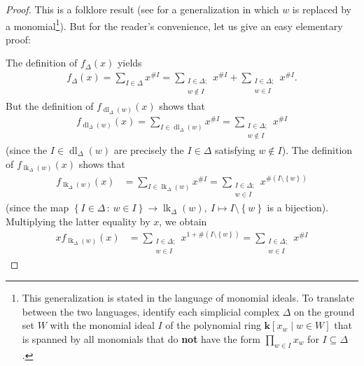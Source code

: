 \documentclass[12pt]{amsart}
\theoremstyle{definition}
\newcommand{\with}{\,\colon\,}
\DeclareMathOperator{\lk}{lk}
\DeclareMathOperator{\dl}{dl}
\newcommand{\set}[1]{\left\{ #1 \right\}}
\newcommand{\tup}[1]{\left( #1 \right)}
\begin{document}
\begin{proof}
This is a folklore result
(see \cite[the equality $\mathcal{F}_\Delta
= x \mathcal{F}_{\tup{\Delta:x}} + \mathcal{F}_{\tup{\Delta,x}}$
in the proof of
Lemma 2.4]{MariettiTesta08} for a generalization
in which $w$ is replaced by a monomial\footnote{This
generalization is stated in the language of monomial
ideals. To translate between the two languages,
identify each simplicial complex $\Delta$ on the ground
set $W$ with the monomial ideal $I$ of the polynomial ring
$\mathbf{k}\left[x_w \mid w \in W\right]$ that is
spanned by all monomials that do \textbf{not} have the
form $\prod_{w \in I} x_w$ for $I \subseteq \Delta$.}).
But for the reader's convenience,
let us give an easy elementary proof:

The definition of $f_{\Delta}\tup{x}$ yields
\begin{align}
f_{\Delta}\tup{x}
= \sum_{I \in \Delta} x^{\# I}
= \sum_{\substack{I \in \Delta; \\ w \notin I}} x^{\# I} + \sum_{\substack{I \in \Delta; \\ w \in I}} x^{\# I} .
\label{pf.lem.fpol.rec.1}
\end{align}
But the definition of $f_{\dl_\Delta(w)}\tup{x}$ shows that
\begin{align}
f_{\dl_\Delta(w)}\tup{x}
= \sum_{I \in \dl_\Delta(w)} x^{\# I}
= \sum_{\substack{I \in \Delta; \\ w \notin I}} x^{\# I}
\label{pf.lem.fpol.rec.2}
\end{align}
(since the $I \in \dl_\Delta(w)$ are precisely the $I \in \Delta$ satisfying $w \notin I$).
The definition of $f_{\lk_\Delta(w)}\tup{x}$ shows that
\begin{align*}
f_{\lk_\Delta(w)}\tup{x}
&= \sum_{I \in \lk_\Delta(w)} x^{\# I}
= \sum_{\substack{I \in \Delta; \\ w \in I}} x^{\# \tup{I \setminus \set{w}}} 
\end{align*}
(since the map $\set{I \in \Delta \with w \in I} \to \lk_\Delta(w),\ I \mapsto I \setminus \set{w}$ is a bijection).
Multiplying the latter equality by $x$, we obtain
\begin{align}
x f_{\lk_\Delta(w)}\tup{x}
&= \sum_{\substack{I \in \Delta; \\ w \in I}} x^{1 + \# \tup{I \setminus \set{w}}} 
= \sum_{\substack{I \in \Delta; \\ w \in I}} x^{ \# I }
\label{pf.lem.fpol.rec.3}

\end{align}
\end{proof}
\end{document}
